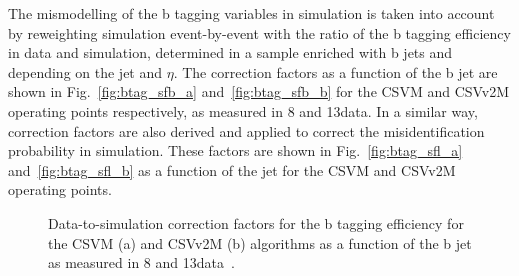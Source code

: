 \begin{table}[!htb]
\centering
\caption{B taggers and discriminator threshold used in CMS for Run~1 and Run~2 and corresponding efficiency for b jets with $\pt > 30\GeV$ in simulated \ttbar events. }
\label{tab:btagwp}
\end{table}

The mismodelling of the b tagging variables in simulation is taken into account by reweighting simulation event-by-event with the ratio of the b tagging efficiency in data and simulation, determined in a sample enriched with b jets and depending on the jet \pt and $\eta$. The correction factors as a function of the b jet \pt  are shown in Fig.~\ref{fig:btag_sfb_a} and~\ref{fig:btag_sfb_b} for the CSVM and CSVv2M operating points respectively, as measured in 8 and 13\TeV data. In a similar way, correction factors are also derived and applied to correct the misidentification probability in simulation. These factors are shown in Fig.~\ref{fig:btag_sfl_a} and~\ref{fig:btag_sfl_b} as a function of the jet \pt for the CSVM and CSVv2M operating points.

\begin{figure}[!htb]
\begin{center}
\end{center} 
\caption{Data-to-simulation correction factors for the b tagging efficiency for the CSVM (a) and CSVv2M (b) algorithms as a function of the b jet \pt as measured in 8 and 13\TeV data~\cite{CMS:BTV13001,CMS-PAS-BTV-15-001}.}
\label{fig:btag_sfb}
\end{figure}

